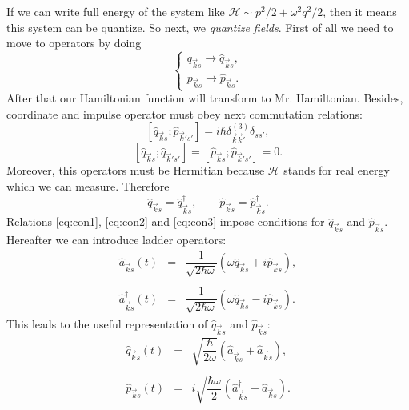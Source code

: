 	If we can write full energy of the system like $\mathscr{H} \sim p^2/2 + \omega^2 q^2/2$, then it means this system can be quantize.  So next, we  \textit{quantize fields}. First of all we need to move to operators by doing
	\begin{equation}
		\begin{cases}
		q_{\vec{k}s} \to \hat{q}_{\vec{k}s}, \\
		p_{\vec{k}s} \to \hat{p}_{\vec{k}s}.
		\end{cases}
	\end{equation}
	After that our Hamiltonian function will transform to Mr. Hamiltonian. 
	Besides, coordinate and impulse operator must obey next commutation relations:
	\begin{equation}
		\left[\hat{q}_{\vec{k}s} ; \hat{p}_{\vec{k}'s'} \right] = i \hbar \delta^{(3)}_{\vec{k}\vec{k}'} \delta_{ss'},
		\label{eq:con1}
	\end{equation} 
	\begin{equation}
		\left[\hat{q}_{\vec{k}s} ; \hat{q}_{\vec{k}'s'} \right] = \left[\hat{p}_{\vec{k}s} ; \hat{p}_{\vec{k}'s'} \right] = 0.
		\label{eq:con2}
	\end{equation}
	Moreover, this operators must be Hermitian because $\mathscr{H}$ stands for real energy which we can measure. Therefore
	\begin{equation}
		\hat{q}_{\vec{k}s} = \hat{q}^{\dagger}_{\vec{k}s}, \qquad \hat{p}_{\vec{k}s} = \hat{p}^{\dagger}_{\vec{k}s}.
		\label{eq:con3}
	\end{equation}
	Relations \eqref{eq:con1}, \eqref{eq:con2} and \eqref{eq:con3} impose conditions for $\hat{q}_{\vec{k}s}$ and $\hat{p}_{\vec{k}s}$.
	Hereafter we can introduce ladder operators:
	\begin{eqnarray}
		\hat{a}_{\vec{k}s}(t) &=& \dfrac{1}{\sqrt{2 \hbar \omega}} \left( \omega \hat{q}_{\vec{k}s} + i \hat{p}_{\vec{k}s} \right), \\ \nonumber \\
		\hat{a}^{\dagger}_{\vec{k}s}(t) &=& \dfrac{1}{\sqrt{2 \hbar \omega}} \left( \omega \hat{q}_{\vec{k}s} - i \hat{p}_{\vec{k}s} \right).
	\end{eqnarray}
	This leads to the useful representation of $\hat{q}_{\vec{k}s}$ and $\hat{p}_{\vec{k}s}$:
	\begin{eqnarray}
		\hat{q}_{\vec{k}s}(t) &=& \sqrt{\dfrac{\hbar}{2 \omega}} \left( \hat{a}^{\dagger}_{\vec{k}s} +  \hat{a}_{\vec{k}s} \right), \\ \nonumber \\
		\hat{p}_{\vec{k}s}(t) &=& i \sqrt{\dfrac{\hbar \omega}{2}} \left( \hat{a}^{\dagger}_{\vec{k}s} -  \hat{a}_{\vec{k}s} \right).
	\end{eqnarray}
	
